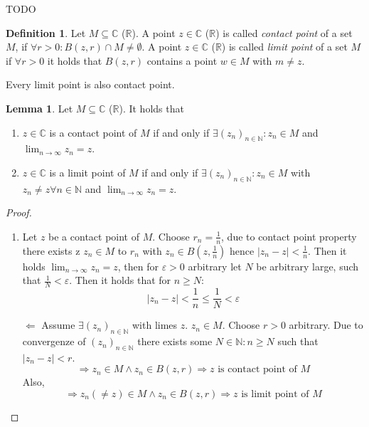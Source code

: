 \documentclass[a4paper,landscape,twocolumn]{article}
\theoremstyle{definition}
\newtheorem{defi}{Definition}
\newtheorem{lemma}{Lemma}
\newcommand\abs[1]{\left|#1\right|}
\newcommand\seq[1]{{\left(#1\right)}_{n \in \mathbb N}}
\begin{document}

TODO

\begin{defi}
  Let $M \subseteq \mathbb C$ ($\mathbb R$).
  A point $z \in \mathbb C$ ($\mathbb R$) is called \emph{contact point}
  of a set $M$, if $\forall r > 0: B(z, r) \cap M \neq \emptyset$.
  A point $z \in \mathbb C$ ($\mathbb R$) is called \emph{limit point}
  of a set $M$ if $\forall r > 0$ it holds that $B(z, r)$ contains a point
  $w \in M$ with $m \neq z$.

  Every limit point is also contact point.
\end{defi}


\begin{lemma}
  \label{characterization-limit-contact-points}
  Let $M \subseteq \mathbb C$ ($\mathbb R$). It holds that
  \begin{enumerate}
    \item $z \in \mathbb C$ is a contact point of $M$
      if and only if $\exists (z_n)_{n \in \mathbb N}: z_n \in M$ and $\lim_{n\to\infty} z_n = z$.
    \item $z \in \mathbb C$ is a limit point of $M$
      if and only if $\exists (z_n)_{n \in \mathbb N}: z_n \in M$ with $z_n \neq z \forall n \in \mathbb N$
      and $\lim_{n\to\infty} z_n = z$.
  \end{enumerate}

\end{lemma}
\begin{proof}
  \begin{enumerate}
    \item Let $z$ be a contact point of $M$. Choose $r_n = \frac1n$, due to contact point property
      there exists z $z_n \in M$ to $r_n$ with $z_n \in B(z, \frac1n)$ hence $\abs{z_n - z} < \frac1n$.
      Then it holds $\lim_{n\to\infty} z_n = z$, then for $\varepsilon > 0$ arbitrary let $N$ be arbitrary large,
      such that $\frac1N < \varepsilon$. Then it holds that for $n \geq N$:
      \[ \abs{z_n - z} < \frac1n \leq \frac1N < \varepsilon \]
    \item[$\Leftarrow$] Assume $\exists \seq{z_n}$ with limes $z$. $z_n \in M$.
      Choose $r > 0$ arbitrary. Due to convergenze of $\seq{z_n}$ there exists some
      $N \in \mathbb N: n \geq N$ such that $\abs{z_n - z} < r$.
      \[ \Rightarrow z_n \in M \land z_n \in B(z, r) \Rightarrow z \text{ is contact point of $M$} \]
      Also,
      \[ \Rightarrow z_n (\neq z) \in M \land z_n \in B(z, r) \Rightarrow z \text{ is limit point of $M$} \]
  \end{enumerate}
\end{proof}
\end{document}

